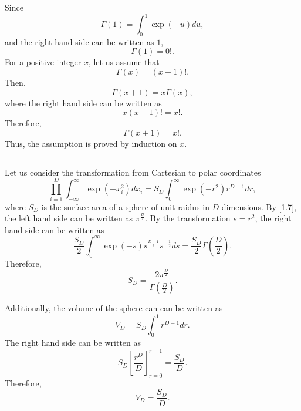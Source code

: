 Since
%
\begin{equation}
\Gamma(1) = \int_{0}^{1} \exp(- u) du,
\end{equation}
%
and the right hand side can be written as $1$,
%
\begin{equation}
\Gamma(1) = 0!.
\end{equation}
%
For a positive integer $x$, let us assume that
%
\begin{equation}
\Gamma(x) = (x - 1)!.
\end{equation}
%
Then,
%
\begin{equation}
\Gamma(x + 1) = x \Gamma(x),
\end{equation}
%
where the right hand side can be written as
%
\begin{equation}
x (x - 1)! = x!.
\end{equation}
%
Therefore,
%
\begin{equation}
\Gamma(x + 1) = x!.
\end{equation}
%
Thus, the assumption is proved by induction on $x$.


\subsection{}
\label{1.18}
Let us consider the transformation from Cartesian to polar coordinates
%
\begin{equation}
\prod_{i = 1}^{D} \int_{- \infty}^{\infty} \exp \left( - x_i ^ 2 \right) dx_i = S_D \int_{0}^{\infty} \exp \left( - r ^ 2 \right) r ^ {D - 1} dr,
\end{equation}
%
where $S_D$ is the surface area of a sphere of unit raidus in $D$ dimensions. 
By \ref{1.7}, the left hand side can be written as $\pi ^ \frac{D}{2}$. By the transformation $s = r ^ 2$, the right hand side can be written as
%
\begin{equation}
\frac{S_D}{2} \int_0^\infty \exp(- s) s ^ \frac{D - 1}{2} s ^ {- \frac{1}{2}} ds = \frac{S_D}{2} \Gamma \left( \frac{D}{2} \right).
\end{equation}
%
Therefore,
%
\begin{equation}
S_D = \frac{2 \pi ^ \frac{D}{2}}{\Gamma \left( \frac{D}{2} \right)}.
\end{equation}
%

Additionally, the volume of the sphere can can be written as
%
\begin{equation}
V_D = S_D \int_{0}^{1} r^{D - 1} dr.
\end{equation}
%
The right hand side can be written as 
%
\begin{equation}
S_D \left[ \frac{r ^ D}{D} \right]_{r = 0}^{r = 1} = \frac{S_D}{D}.
\end{equation}
%
Therefore, 
%
\begin{equation}
V_D = \frac{S_D}{D}.
\end{equation}
%

